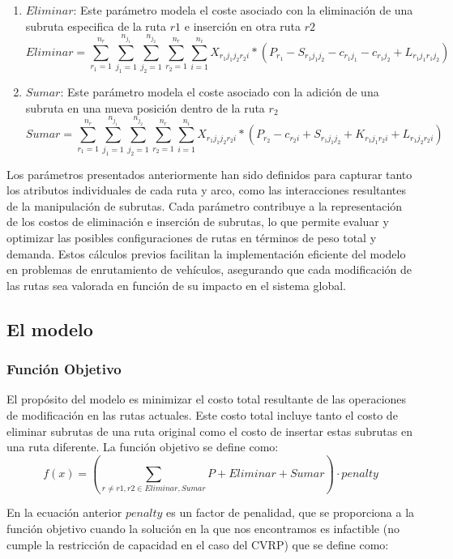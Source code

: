 \documentclass{article}
\begin{document}
\begin{enumerate}
\item {$Eliminar$: Este parámetro modela el coste asociado con la eliminación de una subruta especifica de la ruta $r1$ e inserción en otra ruta $r2$}
\[
Eliminar=\sum\limits_{r_1=1}^{n_{r}} \sum\limits_{j_1=1}^{n_{j_1}}\sum\limits_{j_2=1}^{n_{j_2}}\sum\limits_{r_2=1}^{n_{r}}\sum\limits_{i=1}^{n_i} X_{{r_1}{j_1}{j_2}{r_2}{i}}*(P_{r_1}-S_{{r_1}{j_1}{j_2}}-c_{{r_1}{j_1}}-c_{{r_1}{j_2}}+L_{{r_1}{j_1}{r_1}{j_2}})
\]
\item {$Sumar$: Este parámetro modela el coste asociado con la adición de una subruta en una nueva posición dentro de la ruta $r_2$}
 \[
Sumar=\sum\limits_{r_1=1}^{n_{r}} \sum\limits_{j_1=1}^{n_{j_1}}\sum\limits_{j_2=1}^{n_{j_2}}\sum\limits_{r_2=1}^{n_{r}}\sum\limits_{i=1}^{n_i} X_{{r_1}{j_1}{j_2}{r_2}{i}}*(P_{r_2} - c_{{r_2}{i}} + S_{{r_1}{j_1}{j_2}}+K_{{r_1}{j_1}{r_2}{i}} + L_{{r_1}{j_2}{r_2}{i}}) 
\] 
\end{enumerate}

Los parámetros presentados anteriormente han sido definidos para capturar tanto los atributos individuales de cada ruta y arco, como las interacciones resultantes de la manipulación de subrutas. Cada parámetro contribuye a la representación de los costos de eliminación e inserción de subrutas, lo que permite evaluar y optimizar las posibles configuraciones de rutas en términos de peso total y demanda. Estos cálculos previos facilitan la implementación eficiente del modelo en problemas de enrutamiento de vehículos, asegurando que cada modificación de las rutas sea valorada en función de su impacto en el sistema global.

\subsection{El modelo}
\subsubsection{Función Objetivo}
El propósito del modelo es minimizar el costo total resultante de las operaciones de modificación en las rutas actuales. Este costo total incluye tanto el costo de eliminar subrutas de una ruta original como el costo de insertar estas subrutas en una ruta diferente. La función objetivo se define como:
\[
f(x) =( \sum \limits_{r \neq r1,r2 \in Eliminar,Sumar} P + Eliminar + Sumar) \cdot penalty
\]

En la ecuación anterior $penalty$ es un factor de penalidad, que se proporciona a la función objetivo cuando la solución en la que nos encontramos es infactible (no cumple la restricción de capacidad en el caso del CVRP) que se define como:
\end{document}
